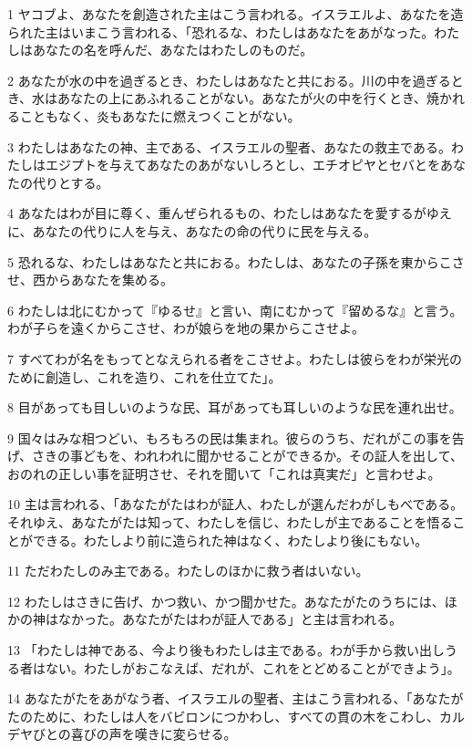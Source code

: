 \par 1 ヤコブよ、あなたを創造された主はこう言われる。イスラエルよ、あなたを造られた主はいまこう言われる、「恐れるな、わたしはあなたをあがなった。わたしはあなたの名を呼んだ、あなたはわたしのものだ。
\par 2 あなたが水の中を過ぎるとき、わたしはあなたと共におる。川の中を過ぎるとき、水はあなたの上にあふれることがない。あなたが火の中を行くとき、焼かれることもなく、炎もあなたに燃えつくことがない。
\par 3 わたしはあなたの神、主である、イスラエルの聖者、あなたの救主である。わたしはエジプトを与えてあなたのあがないしろとし、エチオピヤとセバとをあなたの代りとする。
\par 4 あなたはわが目に尊く、重んぜられるもの、わたしはあなたを愛するがゆえに、あなたの代りに人を与え、あなたの命の代りに民を与える。
\par 5 恐れるな、わたしはあなたと共におる。わたしは、あなたの子孫を東からこさせ、西からあなたを集める。
\par 6 わたしは北にむかって『ゆるせ』と言い、南にむかって『留めるな』と言う。わが子らを遠くからこさせ、わが娘らを地の果からこさせよ。
\par 7 すべてわが名をもってとなえられる者をこさせよ。わたしは彼らをわが栄光のために創造し、これを造り、これを仕立てた」。
\par 8 目があっても目しいのような民、耳があっても耳しいのような民を連れ出せ。
\par 9 国々はみな相つどい、もろもろの民は集まれ。彼らのうち、だれがこの事を告げ、さきの事どもを、われわれに聞かせることができるか。その証人を出して、おのれの正しい事を証明させ、それを聞いて「これは真実だ」と言わせよ。
\par 10 主は言われる、「あなたがたはわが証人、わたしが選んだわがしもべである。それゆえ、あなたがたは知って、わたしを信じ、わたしが主であることを悟ることができる。わたしより前に造られた神はなく、わたしより後にもない。
\par 11 ただわたしのみ主である。わたしのほかに救う者はいない。
\par 12 わたしはさきに告げ、かつ救い、かつ聞かせた。あなたがたのうちには、ほかの神はなかった。あなたがたはわが証人である」と主は言われる。
\par 13 「わたしは神である、今より後もわたしは主である。わが手から救い出しうる者はない。わたしがおこなえば、だれが、これをとどめることができよう」。
\par 14 あなたがたをあがなう者、イスラエルの聖者、主はこう言われる、「あなたがたのために、わたしは人をバビロンにつかわし、すべての貫の木をこわし、カルデヤびとの喜びの声を嘆きに変らせる。

